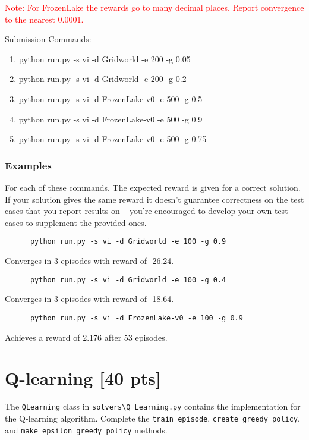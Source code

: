 \documentclass[a4paper]{article}
\theoremstyle{definition}
\newcommand{\red}[1]{\textcolor{red}{#1}}
\begin{document}
\red{Note: For FrozenLake the rewards go to many decimal places. Report convergence to the nearest 0.0001.}

\vspace{8mm}

Submission Commands:
\begin{enumerate} 
    \item   python run.py -s vi -d Gridworld -e 200 -g 0.05
    \item   python run.py -s vi -d Gridworld -e 200 -g 0.2
    \item  python run.py -s vi -d FrozenLake-v0 -e 500 -g 0.5   
    \item  python run.py -s vi -d FrozenLake-v0 -e 500 -g 0.9  
    \item python run.py -s vi -d FrozenLake-v0 -e 500 -g 0.75 
\end{enumerate}
    

\subsubsection*{Examples}

For each of these commands. The expected reward is given for a correct solution. 
If your solution gives the same reward it doesn't guarantee correctness on the test cases that you report results on -- you're encouraged to develop your own test cases to supplement the provided ones.

\begin{verbatim}
      python run.py -s vi -d Gridworld -e 100 -g 0.9  
\end{verbatim}
Converges in 3 episodes with reward of -26.24.

\begin{verbatim}
      python run.py -s vi -d Gridworld -e 100 -g 0.4  
\end{verbatim}
Converges in 3 episodes with reward of -18.64.

\begin{verbatim}
      python run.py -s vi -d FrozenLake-v0 -e 100 -g 0.9  
\end{verbatim}
Achieves a reward of 2.176 after 53 episodes.

\section{Q-learning [40 pts]}

The \verb|QLearning| class in \verb|solvers\Q_Learning.py| contains the implementation for the Q-learning algorithm. Complete the \verb|train_episode|, \verb|create_greedy_policy|,  and \verb|make_epsilon_greedy_policy| methods.
\end{document}
